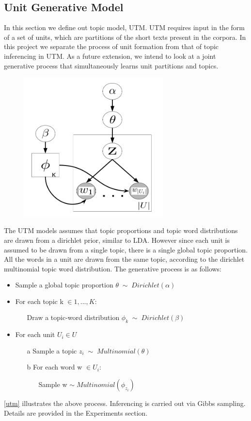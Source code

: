 \documentclass{sig-alternate-05-2015}
\begin{document}
\subsection{Unit Generative Model}
In this section we define out topic model, UTM. UTM requires input in the form of a set of units, which are partitions of the short texts present in the corpora. In this project we separate the process of unit formation from that of topic inferencing in UTM. As a future extension, we intend to look at a joint generative process that simultaneously learns unit partitions and topics.
\\
\begin{figure}
\label{UTM}
\includegraphics[width=3in]{utm}
\end{figure}
The UTM models assumes that topic proportions and topic word distributions are drawn from a dirichlet prior, similar to LDA. However since each unit is assumed to be drawn from a single topic, there is a single global topic proportion. All the words in a unit are drawn from the same topic, according to the dirichlet multinomial topic word distribution. The generative process is as follows:
\begin{itemize}
\item Sample a global topic proportion $\theta \; \sim \; Dirichlet(\alpha)$
\item For each topic k $\in {1, ... ,K}:$ \begin{itemize} \item[] Draw a topic-word distribution $\phi_{k} \; \sim \; Dirichlet(\beta)$\end{itemize}
\item For each unit $U_{i} \in U$\begin{itemize}
\item[a] Sample a topic $z_{i} \; \sim \; Multinomial(\theta)$ 
\item[b] For each word w $\in U_{i}$: \begin{itemize} \item[] Sample w $\sim \; Multinomial(\phi_{z_{i}})$\end{itemize}
\end{itemize}
\end{itemize}
\ref{utm} illustrates the above process. Inferencing is carried out via Gibbs sampling. Details are provided in the Experiments section.
\end{document}
